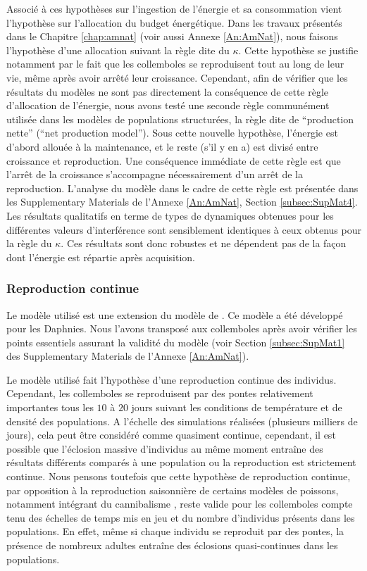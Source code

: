 Associé à ces hypothèses sur l'ingestion de l'énergie et sa consommation vient
l'hypothèse sur l'allocation du budget énergétique. Dans les travaux présentés
dans le Chapitre \ref{chap:amnat} (voir aussi Annexe \ref{An:AmNat}), nous
faisons l'hypothèse d'une allocation suivant la règle dite du $\kappa$. Cette
hypothèse se justifie notamment par le fait que les collemboles se reproduisent
tout au long de leur vie, même après avoir arrêté leur croissance. Cependant,
afin de vérifier que les résultats du modèles ne sont pas directement la
conséquence de cette règle d'allocation de l'énergie, nous avons testé une
seconde règle communément utilisée dans les modèles de populations structurées,
la règle dite de ``production nette'' (``net production model''). Sous cette
nouvelle hypothèse, l'énergie est d'abord allouée à la maintenance, et le reste
(s'il y en a) est divisé entre croissance et reproduction. Une conséquence
immédiate de cette règle est que l'arrêt de la croissance s'accompagne
nécessairement d'un arrêt de la reproduction. L'analyse du modèle dans le cadre
de cette règle est présentée dans les Supplementary Materials de
l'Annexe \ref{An:AmNat}, Section \ref{subsec:SupMat4}. Les résultats qualitatifs
en terme de types de dynamiques obtenues pour les différentes valeurs
d'interférence sont sensiblement identiques à ceux obtenus pour la règle du
$\kappa$. Ces résultats sont donc robustes et ne dépendent pas de la façon dont
l'énergie est répartie après acquisition.

\subsubsection{Reproduction continue}

Le modèle utilisé est une extension du modèle de \textcites{kooijman1984a}. Ce
modèle a été développé pour les Daphnies. Nous l'avons transposé aux collemboles
après avoir vérifier les points essentiels assurant la validité du modèle (voir
Section \ref{subsec:SupMat1} des Supplementary Materials de l'Annexe
\ref{An:AmNat}).

Le modèle utilisé fait l'hypothèse d'une reproduction continue des individus.
Cependant, les collemboles se reproduisent par des pontes relativement
importantes tous les $10$ à $20$ jours suivant les conditions de température et
de densité des populations. A l'échelle des simulations réalisées (plusieurs
milliers de jours), cela peut être considéré comme quasiment continue,
cependant, il est possible que l'éclosion massive d'individus au même moment
entraîne des résultats différents comparés à une population ou la reproduction
est strictement continue. Nous pensons toutefois que cette hypothèse de reproduction
continue, par opposition à la reproduction saisonnière de certains modèles de
poissons, notamment intégrant du cannibalisme
\autocites{claessen2000a,claessen2004a}, reste valide pour les collemboles
compte tenu des échelles de temps mis en jeu et du nombre d'individus présents
dans les populations. En effet, même si chaque individu se reproduit par des
pontes, la présence de nombreux adultes entraîne des éclosions quasi-continues
dans les populations.

